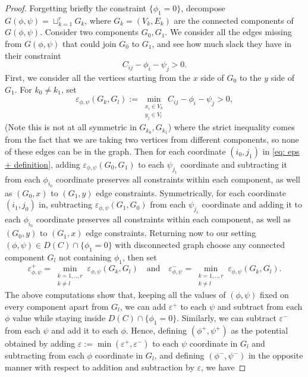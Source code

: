 \documentclass[11pt, oneside, titlepage]{book}
\theoremstyle{plain}
\theoremstyle{definition}
\begin{document}
\begin{proof}
Forgetting briefly the constraint $\{\phi_1=0\}$, decompose $G(\phi, \psi) = \sqcup_{k=1}^r G_{k}$, where $G_k = (V_k, E_k)$ are the connected components of $G(\phi, \psi)$. Consider two components $G_0, G_1$. We consider all the edges missing from $G(\phi, \psi)$ that could join $G_0$ to $G_1$, and see how much slack they have in their constraint
\begin{equation*}
\label{eq: slack cost constraint}
    C_{ij} - \phi_i -\psi_j >0.
\end{equation*}
First, we consider all the vertices starting from the $x$ side of $G_0$ to the $y$ side of $G_1$. For $k_0 \neq k_1$, set
\begin{equation}
    \label{eq: eps + definition}
    \varepsilon_{\phi, \psi}(G_{k}, G_{l}):= \min_{\substack{x_{i} \in V_{k}\\y_{j} \in V_{l}}} C_{ij} - \phi_{i} - \psi_{j} >0,
\end{equation}
(Note this is not at all symmetric in $G_{k_0}, G_{k_1}$) where the strict inequality comes from the fact that we are taking two vertices from different components, so none of these edges can be in the graph. Then for each coordinate $(i_0, j_1)$ in \eqref{eq: eps + definition}, adding $\varepsilon_{\phi, \psi}(G_{0}, G_{1})$ to each $\psi_{j_1}$ coordinate and subtracting it from each $\phi_{i_0}$ coordinate preserves all constraints within each component, as well as $(G_0, x)$ to $(G_1, y)$ edge constraints. Symmetrically, for each coordinate $(i_1, j_0)$ in, subtracting $\varepsilon_{\phi, \psi}(G_{1}, G_{0})$ from each $\psi_{j_1}$ coordinate and adding it to each $\phi_{i_0}$ coordinate preserves all constraints within each component, as well as $(G_0, y)$ to $(G_1, x)$ edge constraints. Returning now to our setting $(\phi, \psi) \in D(C) \cap \{\phi_1=0\}$ with disconnected graph choose any connected component $G_l$ not containing $\phi_1$, then set
\begin{equation*}
    \varepsilon^+_{\phi, \psi} = \min_{\substack{k=1,..,r\\ k \neq l}} \varepsilon_{\phi, \psi}(G_{k}, G_{l}) \quad  \text{and} \quad \varepsilon^-_{\phi, \psi} = \min_{\substack{k=1,..,r\\ k \neq l}} \varepsilon_{\phi, \psi}(G_k, G_l).
\end{equation*}
The above computations show that, keeping all the values of $(\phi, \psi)$ fixed on every component apart from $G_l$, we can add $\varepsilon^+$ to each $\psi$ and subtract from each $\phi$ value while staying inside $D(C) \cap \{\phi_1=0\}$. Similarly, we can subtract $\varepsilon^-$ from each $\psi$ and add it to each $\phi$. Hence, defining $(\phi^+, \psi^+)$ as the potential obtained by adding $\varepsilon:= \min(\varepsilon^+, \varepsilon^-)$ to each $\psi$ coordinate in $G_l$ and subtracting from each $\phi$ coordinate in $G_l$, and defining $(\phi^-, \psi^-)$ in the opposite manner with respect to addition and subtraction by $\varepsilon$, we have

\end{proof}
\end{document}
